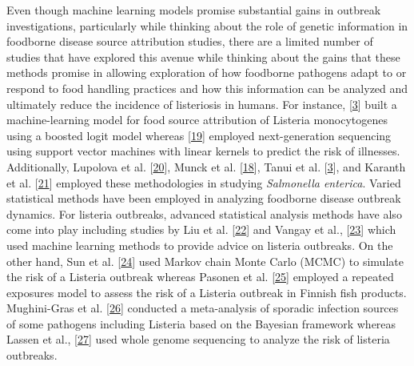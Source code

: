 \documentclass[
  10pt,
]{article}
\begin{document}
Even though machine learning models promise substantial gains in outbreak investigations, particularly while thinking about the role of genetic information in foodborne disease source attribution studies, there are a limited number of studies that have explored this avenue while thinking about the gains that these methods promise in allowing exploration of how foodborne pathogens adapt to or respond to food handling practices and how this information can be analyzed and ultimately reduce the incidence of listeriosis in humans. For instance, {[}\protect\hyperlink{ref-tanui2022machine}{3}{]} built a machine-learning model for food source attribution of Listeria monocytogenes using a boosted logit model whereas {[}\protect\hyperlink{ref-Njage2019}{19}{]} employed next-generation sequencing using support vector machines with linear kernels to predict the risk of illnesses. Additionally, Lupolova et al. {[}\protect\hyperlink{ref-lupolova2017patchy}{20}{]}, Munck et al. {[}\protect\hyperlink{ref-Munck2020}{18}{]}, Tanui et al. {[}\protect\hyperlink{ref-tanui2022machine}{3}{]}, and Karanth et al. {[}\protect\hyperlink{ref-karanth2022exploring}{21}{]} employed these methodologies in studying \emph{Salmonella enterica}. Varied statistical methods have been employed in analyzing foodborne disease outbreak dynamics. For listeria outbreaks, advanced statistical analysis methods have also come into play including studies by Liu et al. {[}\protect\hyperlink{ref-liu2021machine}{22}{]} and Vangay et al., {[}\protect\hyperlink{ref-vangay2014classification}{23}{]} which used machine learning methods to provide advice on listeria outbreaks. On the other hand, Sun et al. {[}\protect\hyperlink{ref-sun2019quantitative}{24}{]} used Markov chain Monte Carlo (MCMC) to simulate the risk of a Listeria outbreak whereas Pasonen et al. {[}\protect\hyperlink{ref-pasonen2019listeria}{25}{]} employed a repeated exposures model to assess the risk of a Listeria outbreak in Finnish fish products. Mughini-Gras et al. {[}\protect\hyperlink{ref-mughini2022statistical}{26}{]} conducted a meta-analysis of sporadic infection sources of some pathogens including Listeria based on the Bayesian framework whereas Lassen et al., {[}\protect\hyperlink{ref-lassen2016two}{27}{]} used whole genome sequencing to analyze the risk of listeria outbreaks.
\end{document}

